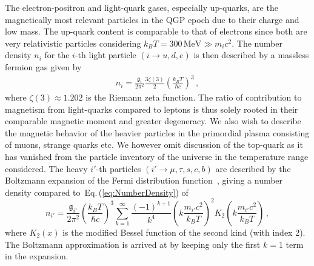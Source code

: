 \documentclass[epjST]{svjour}
\newcommand{\req}[1]{Eq.\,(\ref{#1})}
\begin{document}
The electron-positron and light-quark gases, especially up-quarks, are the magnetically most relevant particles in the QGP epoch due to their charge and low mass. The up-quark content is comparable to that of electrons since both are very relativistic particles considering \(k_{B}T=300\,\mathrm{MeV}\gg m_i c^{2}\). {\color{blue}The number density \(n_{i}\) for the \(i\)-th light particle \((i\rightarrow u,d,e)\) is then described by a massless fermion gas given by~\cite{Letessier:2002ony}
\begin{align}
\label{eq:NumberDensity}
n_{i} = \frac{\mathfrak{g}_{i}}{2\pi^{2}}\frac{3\zeta(3)}{2}\left(\frac{k_{B}T}{\hbar c}\right)^{3}\,,
\end{align}
}where \(\zeta(3)\approx1.202\) is the Riemann zeta function. The ratio of contribution to magnetism from light-quarks compared to leptons is thus solely rooted in their comparable magnetic moment and greater degeneracy. {\color{blue} We also wish to describe the magnetic behavior of the heavier particles in the primordial plasma consisting of muons, strange quarks etc. We however omit discussion of the top-quark as it has vanished from the particle inventory of the universe in the temperature range considered. The heavy \(i'\)-th particles \((i'\rightarrow \mu,\tau,s,c,b)\) are described by the Boltzmann expansion of the Fermi distribution function~\cite{Letessier:2002ony,Yang:2024ret}, giving a number density compared to~\req{eq:NumberDensity} of
\begin{equation}
\label{eq:HeavyNumberDensity}
n_{i'} = \frac{\mathfrak{g}_{i'}}{2\pi^{2}}\left(\frac{k_{B}T}{\hbar c}\right)^{3}\sum_{k=1}^{\infty}\frac{(-1)^{k+1}}{k^4}\left(k\frac{m_{i'}c^{2}}{k_{B}T}\right)^{2}K_{2}\left(k\frac{m_{i'}c^{2}}{k_{B}T}\right)\,,
\end{equation}
where \(K_{2}(x)\) is the modified Bessel function of the second kind (with index 2). The Boltzmann approximation is arrived at by keeping only the first \(k=1\) term in the expansion.}
\end{document}
